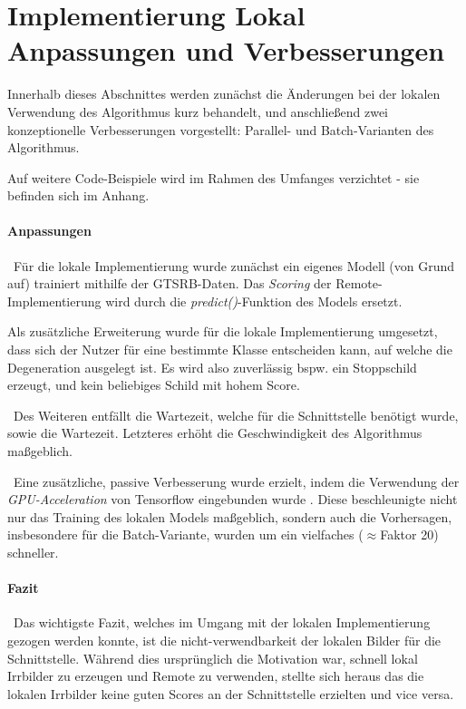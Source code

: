 \section[Implementierung Lokal]{Implementierung Lokal \newline Anpassungen und Verbesserungen}
\label{sec:DegenerationLokal}

Innerhalb dieses Abschnittes werden zunächst die Änderungen bei der lokalen Verwendung des Algorithmus kurz behandelt, und anschließend zwei konzeptionelle Verbesserungen vorgestellt: Parallel- und Batch-Varianten des Algorithmus. 

Auf weitere Code-Beispiele wird im Rahmen des Umfanges verzichtet - sie befinden sich im Anhang.

\paragraph{Anpassungen} ~\newline Für die lokale Implementierung wurde zunächst ein eigenes Modell (von Grund auf) trainiert mithilfe der GTSRB-Daten. Das \textit{Scoring} der Remote-Implementierung wird durch die \textit{predict()}-Funktion des Models ersetzt.

Als zusätzliche Erweiterung wurde für die lokale Implementierung umgesetzt, dass sich der Nutzer für eine bestimmte Klasse entscheiden kann, auf welche die Degeneration ausgelegt ist. Es wird also zuverlässig bspw. ein Stoppschild erzeugt, und kein beliebiges Schild mit hohem Score. 

~\newline Des Weiteren entfällt die Wartezeit, welche für die Schnittstelle benötigt wurde, sowie die Wartezeit. Letzteres erhöht die Geschwindigkeit des Algorithmus maßgeblich. 

~\newline Eine zusätzliche, passive Verbesserung wurde erzielt, indem die Verwendung der \textit{GPU-Acceleration} von Tensorflow eingebunden wurde . Diese beschleunigte nicht nur das Training des lokalen Models maßgeblich, sondern auch die Vorhersagen, insbesondere für die Batch-Variante, wurden um ein vielfaches ($\approx$Faktor 20) schneller.  

\paragraph{Fazit}~\newline Das wichtigste Fazit, welches im Umgang mit der lokalen Implementierung gezogen werden konnte, ist die nicht-verwendbarkeit der lokalen Bilder für die Schnittstelle. Während dies ursprünglich die Motivation war, schnell lokal Irrbilder zu erzeugen und Remote zu verwenden, stellte sich heraus das die lokalen Irrbilder keine guten Scores an der Schnittstelle erzielten und vice versa. 

